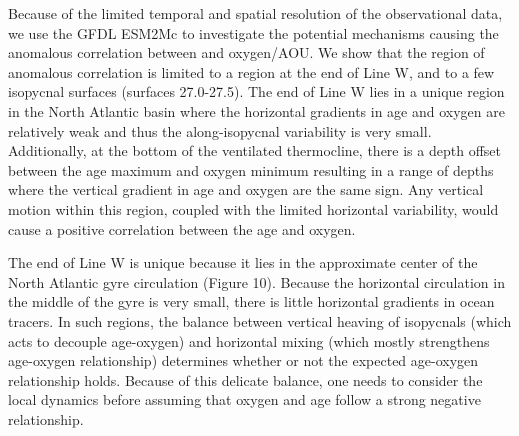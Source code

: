 Because of the limited temporal and spatial resolution of the observational data, we use the GFDL ESM2Mc to investigate the potential mechanisms causing the anomalous correlation between and oxygen/AOU. We show that the region of anomalous correlation is limited to a region at the end of Line W, and to a few isopycnal surfaces (surfaces 27.0-27.5). The end of Line W lies in a unique region in the North Atlantic basin where the horizontal gradients in age and oxygen are relatively weak and thus the along-isopycnal variability is very small. Additionally, at the bottom of the ventilated thermocline, there is a depth offset between the age maximum and oxygen minimum resulting in a range of depths where the vertical gradient in age and oxygen are the same sign. Any vertical motion within this region, coupled with the limited horizontal variability, would cause a positive correlation between the age and oxygen.

The end of Line W is unique because it lies in the approximate center of the North Atlantic gyre circulation (Figure 10). Because the horizontal circulation in the middle of the gyre is very small, there is little horizontal gradients in ocean tracers. In such regions, the balance between vertical heaving of isopycnals (which acts to decouple age-oxygen) and horizontal mixing (which mostly strengthens age-oxygen relationship) determines whether or not the expected age-oxygen relationship holds. Because of this delicate balance, one needs to consider the local dynamics before assuming that oxygen and age follow a strong negative relationship.



%
